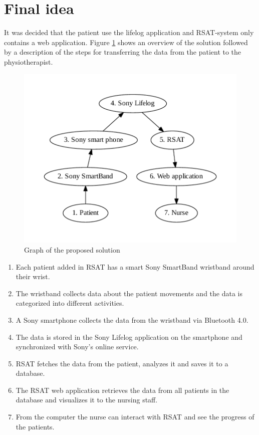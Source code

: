 \documentclass{cslthse-msc}
\begin{document}
\section{Final idea}
\label{sec:proposed-solution}
It was decided that the patient use the lifelog application and RSAT-system only contains a web application. 
Figure \ref{fig:pro} shows an overview of the solution followed by a description of the steps for transferring the data from the patient to the physiotherapist.



\begin{figure}[!hbt]
\centering
\includegraphics[scale=0.8]{proposed.pdf} 
\caption{Graph of the proposed solution}\label{fig:pro}
\end{figure}


\begin{enumerate}
    \item Each patient added in RSAT has a smart Sony SmartBand wristband around their wrist.
    \item The wristband collects data about the patient movements and the data is categorized into different activities.
    \item A Sony smartphone collects the data from the wristband via Bluetooth 4.0. 
    \item The data is stored in the Sony Lifelog application on the smartphone and synchronized with Sony's online service.
    \item RSAT fetches the data from the patient, analyzes it and saves it to a database.
\item The RSAT web application retrieves the data from all patients in the database and visualizes it to the nursing staff.
\item From the computer the nurse can interact with RSAT and see the progress of the patients. 
\end{enumerate}
\end{document}
